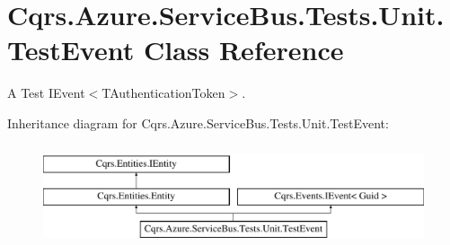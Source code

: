 \hypertarget{classCqrs_1_1Azure_1_1ServiceBus_1_1Tests_1_1Unit_1_1TestEvent}{}\section{Cqrs.\+Azure.\+Service\+Bus.\+Tests.\+Unit.\+Test\+Event Class Reference}
\label{classCqrs_1_1Azure_1_1ServiceBus_1_1Tests_1_1Unit_1_1TestEvent}


A Test I\+Event$<$\+T\+Authentication\+Token$>$.  


Inheritance diagram for Cqrs.\+Azure.\+Service\+Bus.\+Tests.\+Unit.\+Test\+Event\+:\begin{figure}[H]
\begin{center}
\leavevmode
\includegraphics[height=3.000000cm]{classCqrs_1_1Azure_1_1ServiceBus_1_1Tests_1_1Unit_1_1TestEvent}
\end{center}
\end{figure}
